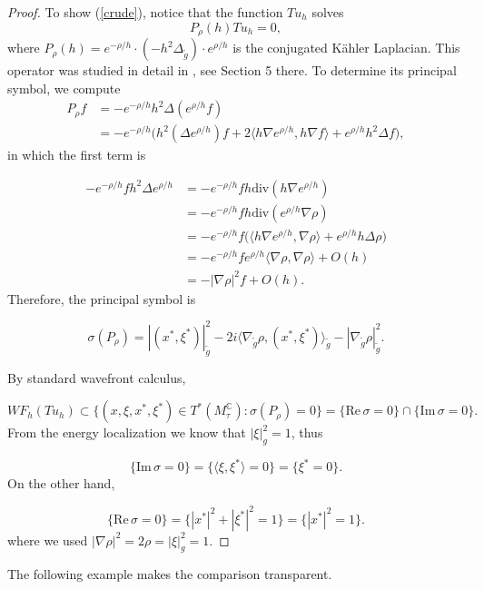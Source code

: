 \documentclass[11pt,reqno]{amsart}
\renewcommand{\Im} {\mathrm{Im\,}}
\renewcommand{\Re} {\mathrm{Re\,}}
\theoremstyle{definition}
\begin{document}
\begin{proof}
To show (\ref{crude}), notice that the function $Tu_h$ solves
$$
P_{\rho}(h)Tu_h=0,
$$
where $P_{\rho}(h)=e^{-\rho/h}\cdot(-h^2\Delta_{\tilde{g}})\cdot e^{\rho/h}$ is the conjugated K\"ahler Laplacian. This operator was studied in detail in \cite{CT24}, see Section 5 there. To determine its principal symbol, we compute
\begin{align*}
    P_{\rho}f&=-e^{-\rho/h}h^2\Delta (e^{\rho/h}f)\\
    &=-e^{-\rho/h}\big(h^2(\Delta e^{\rho/h})f+2\langle h\nabla e^{\rho/h},h\nabla f\rangle+e^{\rho/h}h^2\Delta f\big),
\end{align*}
in which the first term is 

\begin{align*}
    -e^{-\rho/h}f h^2\Delta e^{\rho/h}
    &=-e^{-\rho/h} f h\text{div}(h\nabla e^{\rho/h})\\
    &=-e^{-\rho/h} f h\text{div}(e^{\rho/h}\nabla \rho)\\
    &=-e^{-\rho/h} f \big(\langle h\nabla e^{\rho/h},\nabla\rho\rangle+e^{\rho/h}h\Delta\rho\big)\\
    &=-e^{-\rho/h} f e^{\rho/h}\langle\nabla\rho,\nabla \rho\rangle+O(h)\\
    &=-|\nabla\rho|^2f+O(h).
\end{align*}
Therefore, the principal symbol is

$$
    \sigma(P_{\rho})=
    |(x^*,\xi^*)|_{\tilde{g}}^2-2i\langle\nabla_{\tilde{g}}\rho,(x^*,\xi^*)\rangle_{\tilde{g}}-|\nabla_{\tilde{g}}\rho|_{\tilde{g}}^2.
$$

By standard wavefront calculus, 

$$
WF_h(Tu_h)\subset \{(x,\xi,x^*,\xi^*)\in T^*(M^{\mathbb{C}}_{\tau}):\sigma(P_{\rho})=0\}=\{\Re\sigma=0\}\cap\{\Im\sigma=0\}.
$$
From the energy localization \cite{GT19} we know that $|\xi|_g^2=1$, thus

$$
\{\Im\sigma=0\}=\{\langle \xi,\xi^*\rangle=0\}=\{\xi^*=0\}.
$$
On the other hand,

$$
\{\Re\sigma=0\}=\{|x^*|^2+|\xi^*|^2=1\}=\{|x^*|^2=1\}.
$$
where we used  $|\nabla\rho|^2=2\rho=|\xi|^2_g=1$.
\end{proof}


The following example makes the comparison transparent. 
\end{document}
